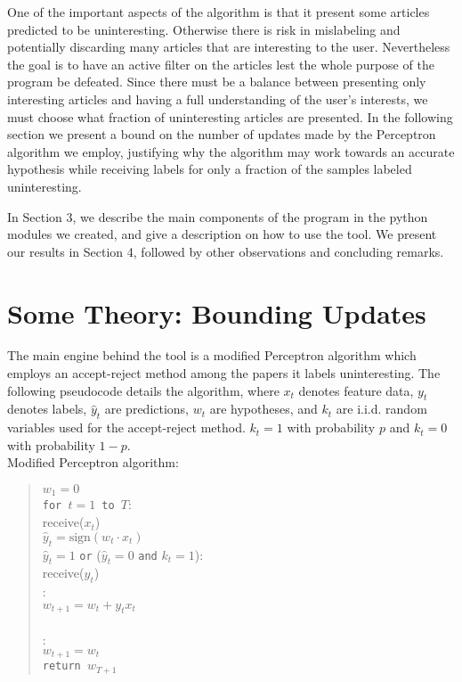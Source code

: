 \documentclass[12pt]{article}
\begin{document}
One of the important aspects of the algorithm is that it present some articles predicted to be uninteresting. Otherwise there is risk in mislabeling and potentially discarding many articles that are interesting to the user. Nevertheless the goal is to have an active filter on the articles lest the whole purpose of the program be defeated. Since there must be a balance between presenting only interesting articles and having a full understanding of the user's interests, we must choose what fraction of uninteresting articles are presented. In the following section we present a bound on the number of updates made by the Perceptron algorithm we employ, justifying why the algorithm may work towards an accurate hypothesis while receiving labels for only a fraction of the samples labeled uninteresting.

In Section 3, we describe the main components of the program in the python modules we created, and give a description on how to use the tool. We present our results in Section 4, followed by other observations and concluding remarks.



\section{Some Theory: Bounding Updates}

The main engine behind the tool is a modified Perceptron algorithm which employs an accept-reject method among the papers it labels uninteresting. The following pseudocode details the algorithm, where $x_t$ denotes feature data, $y_t$ denotes labels, $\widehat{y}_t$ are predictions, $w_t$ are hypotheses, and $k_t$ are i.i.d. random variables used for the accept-reject method. $k_t = 1$ with probability $p$ and $k_t = 0$ with probability $1-p$.\\


\noindent Modified Perceptron algorithm:
\begin{quotation}
\noindent $w_1=0$\\
{\tt for $t=1$ to $T$}:\\
\indent receive($x_t$)\\
\indent $\widehat{y}_t=\mbox{sign}(w_t\cdot x_t)$\\
 $\widehat{y}_t =1$ {\tt or} ($\widehat{y}_t =0$ {\tt and} $k_t = 1$):\\
\indent\indent receive($y_t$)\\
\indent{}:\\
\indent\indent\indent $w_{t+1} = w_t + y_t x_t$\\
\indent{}\\
:\\
\indent\indent $w_{t+1} = w_t$\\
{\tt return $w_{T+1}$}

\end{quotation}
\end{document}
